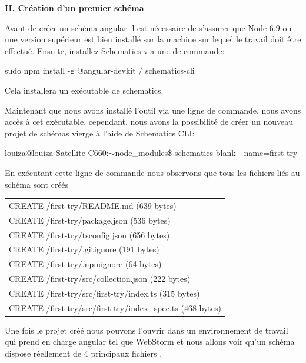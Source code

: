 \documentclass[12pt,french]{article}
\begin{document}
	\textbf{II. Création d'un premier schéma}\newline
	
	Avant de créer un schéma angular il est nécessaire de s'assurer que Node 6.9 ou une version supérieur est bien installé sur la machine sur lequel le travail doit être effectué. 
	Ensuite, installez Schematics via une de commande:
\newline
	
	\qquad sudo npm install -g @angular-devkit / schematics-cli \newline
	
	Cela installera un exécutable de schematics.\newline
	
	\newpage Maintenant que nous avons installé l'outil via une ligne de commande, nous avons accès à cet exécutable, cependant, nous avons la possibilité de créer un nouveau projet de schémas vierge à l'aide de Schematics CLI:\newline
	
	\qquad louiza@louiza-Satellite-C660:$\sim$node\_modules\$ schematics blank \--\--name=first-try\newline
	
	En exécutant cette ligne de commande nous observons que tous les fichiers liés au schéma sont créés\newline
	
	\begin{tabular}{l}
		\qquad CREATE /first-try/README.md (639 bytes)\\
		\qquad CREATE /first-try/package.json (536 bytes)\\
		\qquad CREATE /first-try/tsconfig.json (656 bytes)\\
		\qquad CREATE /first-try/.gitignore (191 bytes)\\
		\qquad CREATE /first-try/.npmignore (64 bytes)\\
		\qquad CREATE /first-try/src/collection.json (222 bytes)\\
		\qquad CREATE /first-try/src/first-try/index.ts (315 bytes)\\
		\qquad CREATE /first-try/src/first-try/index\_spec.ts (468 bytes)
	\end{tabular}\break

	 Une fois le projet créé nous pouvons l’ouvrir dans un environnement de travail qui prend en charge angular tel que WebStorm et nous allons voir qu’un schéma dispose réellement de 4 principaux fichiers .\newline
\end{document}
